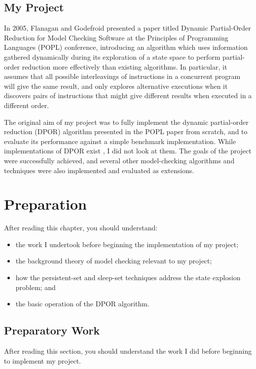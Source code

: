 \documentclass[12pt,a4paper,twoside,openright]{report}
\newenvironment{understandinglist}
	{\begin{itemize} \itemsep 0em}{\end{itemize}}
\begin{document}
\section{My Project}

In 2005, Flanagan and Godefroid presented
a paper titled Dynamic Partial-Order Reduction
for Model Checking Software  \cite{flan05}
at the Principles
of Programming Languages (POPL) conference,
introducing an algorithm
which uses information gathered dynamically
during its
exploration of a state space
to perform partial-order reduction more
effectively than existing algorithms.
In particular, it assumes that
all possible interleavings of
instructions in a concurrent program will
give the same result, and only explores
alternative executions when it discovers
pairs of instructions that might give
different results when executed in a
different order.

The original aim of my project was to
fully implement the dynamic partial-order
reduction (DPOR) algorithm presented in the POPL
paper from scratch, and to evaluate its performance
against a simple benchmark implementation.
While implementations of
DPOR exist \cite{yang09, vo09},
I did not look at them.
The goals of the project were successfully
achieved, and several other model-checking
algorithms and techniques were also
implemented and evaluated as extensions.

\chapter{Preparation}
\label{cha:prep}
After reading this chapter,
you should understand:
\begin{understandinglist}
	\item the work I undertook before beginning
	the implementation of my project;
	\item the background theory of model checking
	relevant to my project;
	\item how the persistent-set
	and sleep-set techniques address the state explosion
	problem; and
	\item the basic operation of the DPOR algorithm.
\end{understandinglist}

\section{Preparatory Work}
After reading this section,
you should understand the work I
did before beginning to implement
my project.
\end{document}
